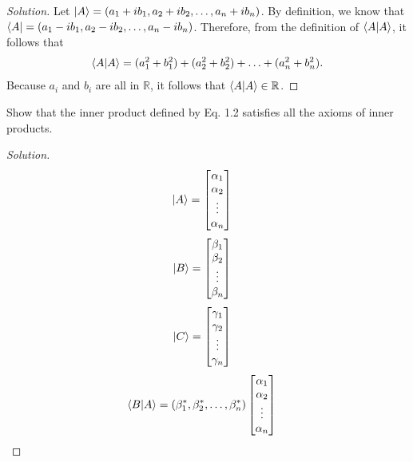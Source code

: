 \documentclass[10pt]{article}
\newenvironment{problem}[2][Problem]{\begin{trivlist}
\item[\hskip \labelsep {\bfseries #1}\hskip \labelsep {\bfseries #2.}]}{\end{trivlist}}
\begin{document}
\begin{proof}[Solution]
  Let $\ket{A} = (a_1 + i b_1, a_2 + i b_2,\hdots, a_n + i b_n)$. By definition,
  we know that $\bra{A} = (a_1 - i b_1, a_2 - i b_2,\hdots, a_n - i b_n)$.
  Therefore, from the definition of $\bra{A}\ket{A}$, it follows that
  \begin{align*}
    \bra{A}\ket{A} = (a_1^2 + b_1^2) + (a_2^2 + b_2^2) +\hdots + (a_n^2 + b_n^2).
  \end{align*}
  Because $a_i$ and $b_i$ are all in $\mathbb{R}$, it follows that $\bra{A}\ket{A}\in\mathbb{R}$.
\end{proof}

\begin{problem}{1.2}
Show that the inner product defined by Eq. 1.2 satisfies all the axioms of inner products.
\end{problem}

\begin{proof}[Solution]

  \begin{align*}
     \ket{A} &= \begin{bmatrix}
      \alpha_{1} \\
      \alpha_{2} \\
      \vdots \\
      \alpha_{n}
    \end{bmatrix}
  \end{align*}
  \begin{align*}
    \ket{B} &= \begin{bmatrix}
     \beta_{1} \\
     \beta_{2} \\
     \vdots \\
     \beta_{n}
   \end{bmatrix}
 \end{align*}
 \begin{align*}
  \ket{C} &= \begin{bmatrix}
   \gamma_{1} \\
   \gamma_{2} \\
   \vdots \\
   \gamma_{n}
 \end{bmatrix}
\end{align*}
 \begin{align*}
  \bra{B}\ket{A} &= (\beta_1^*, \beta_2^*, \hdots, \beta_n^*)\begin{bmatrix}
   \alpha_{1} \\
   \alpha_{2} \\
   \vdots \\
   \alpha_{n}
 \end{bmatrix}
\end{align*}
\end{proof}
\end{document}
